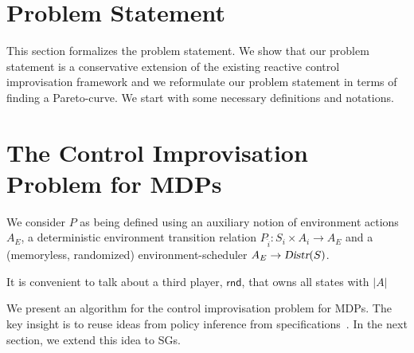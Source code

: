 \documentclass[conference]{IEEEtran}
\theoremstyle{remark}
\newcommand{\Distr}{\ensuremath{\textsl{Distr}}}
\newcommand{\Act}{A}
\newcommand{\target}{s_{\top}}
\newcommand{\sink}{s_{\bot}}
\begin{document}
\section{Problem Statement}
This section formalizes the problem statement. We show that our problem statement is a conservative extension of the existing reactive control improvisation framework and we reformulate our problem statement in terms of finding a Pareto-curve. We start with some necessary definitions and notations.







\section{The Control Improvisation Problem for MDPs}
\color{black!50}
We consider $P$ as being defined using an auxiliary notion of environment actions $\Act_E$, a deterministic environment transition relation $P_{\hat{i}}\colon S_i \times \Act_i \rightarrow A_E$ and a (memoryless, randomized) environment-scheduler $A_E \rightarrow \Distr(S)$.



It is convenient to talk about a third player, $\mathsf{rnd}$, that owns all states with $|\Act|$
\color{black}

We present an algorithm for the control improvisation problem for MDPs. The key insight is to reuse ideas from policy inference from specifications~\cite{DBLP:conf/cav/Vazquez-Chanlatte20}.
In the next section, we extend this idea to SGs. 

\begin{figure}
\begin{subfigure}{0.3\columnwidth}
\centering
{}
\caption{}
\end{subfigure}
\begin{subfigure}{0.3\columnwidth}
\begin{tikzpicture}	
\end{tikzpicture}
\caption{}
\end{subfigure}
\begin{subfigure}{0.3\columnwidth}
\begin{tikzpicture}	
\end{tikzpicture}
\caption{}
\end{subfigure}


\end{figure}
\end{document}
